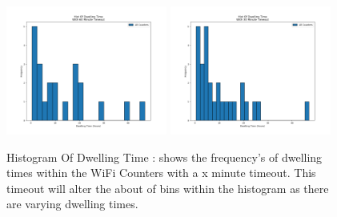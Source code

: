 \documentclass{report}
\begin{document}
\begin{figure}[h!]
    \centering
    \includegraphics[width=200]{Hist_Dwelling_Time_60M_TO.png}
    \includegraphics[width=200]{Hist_Dwelling_Time_30M_TO.png}
    \caption{Histogram Of Dwelling Time : shows the frequency's of dwelling times within the WiFi Counters with a x minute timeout. This timeout will alter the about of bins within the histogram as there are varying dwelling times.}
    \label{fig:histdwellingTime}
\end{figure} \\ 
\end{document}
